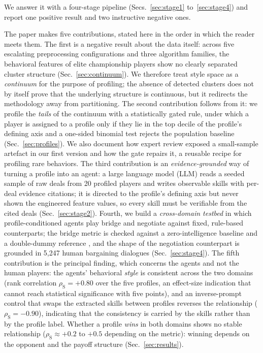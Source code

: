 \documentclass[11pt,a4paper]{article}
\newcommand{\rhoS}{\rho_{\mathrm{S}}}
\begin{document}
We answer it with a four-stage pipeline (Secs.~\ref{sec:stage1}
to~\ref{sec:stage4}) and report one positive result and two
instructive negative ones.

The paper makes five contributions, stated here in the order in which
the reader meets them. The first is a negative result about the data
itself: across five escalating preprocessing configurations and three
algorithm families, the behavioral features of elite championship
players show no clearly separated cluster structure
(Sec.~\ref{sec:continuum}). We therefore treat style space as a
\emph{continuum} for the purpose of profiling; the absence of detected
clusters does not by itself prove that the underlying structure is
continuous, but it redirects the methodology away from partitioning.
The second contribution
follows from it: we profile the \emph{tails} of the continuum with a
statistically gated rule, under which a player is assigned to a profile
only if they lie in the top decile of the profile's defining axis and a
one-sided binomial test rejects the population baseline
(Sec.~\ref{sec:profiles}). We also document how expert review exposed a
small-sample artefact in our first version and how the gate repairs it,
a reusable recipe for profiling rare behaviors. The third contribution
is an \emph{evidence-grounded} way of turning a profile into an agent: a
large language model (LLM) reads a seeded sample of raw deals from 20
profiled players and writes observable skills with per-deal evidence
citations; it is directed to the profile's defining axis but never shown
the engineered feature values, so every skill must be verifiable from
the cited deals (Sec.~\ref{sec:stage2}). Fourth, we build a
\emph{cross-domain testbed} in which profile-conditioned agents play
bridge and negotiate against fixed, rule-based counterparts; the bridge
metric is checked against a zero-intelligence baseline
\cite{gode1993zi} and a double-dummy reference \cite{ginsberg2001gib},
and the shape of the negotiation counterpart is grounded in 5{,}247
human bargaining dialogues \cite{he2018decoupling}
(Sec.~\ref{sec:stage4}). The fifth contribution is the principal
finding, which concerns the agents and not the human players: the
agents' behavioral \emph{style} is consistent across the two domains
(rank correlation $\rhoS=+0.80$ over the five profiles, an effect-size
indication that cannot reach statistical significance with five
points), and an inverse-prompt control that swaps the extracted skills
between profiles reverses the relationship ($\rhoS=-0.90$), indicating
that the consistency is carried by the skills rather than by the
profile label. Whether a profile \emph{wins} in both domains shows no
stable relationship ($\rhoS\approx+0.2$ to $+0.5$ depending on the
metric): winning depends on the opponent and the payoff structure
(Sec.~\ref{sec:results}).
\end{document}

